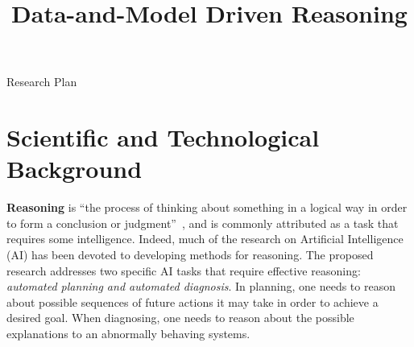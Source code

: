 \documentclass[12pt]{article}
\newcommand{\note}[1]{\textbf{\textit{#1}}}
\begin{document}
\title{Data-and-Model Driven Reasoning}

\begin{center}
\LARGE{Research Plan}
\end{center}

\section{Scientific and Technological Background}


{\bf Reasoning} is ``the process of thinking about something in a logical way in order to form a conclusion or judgment''~\cite{reasoning2016dictionary}, and is commonly attributed as a task that requires some intelligence. Indeed, much of the research on Artificial Intelligence (AI) has been devoted to developing methods for reasoning. The proposed research addresses two specific AI tasks that require effective reasoning:  {\em automated planning and automated diagnosis}. 
In planning, one needs to reason about possible sequences of future actions it may take in order to achieve a desired goal. 
When diagnosing, one needs to reason about the possible explanations to an abnormally behaving systems. 





\end{document}
